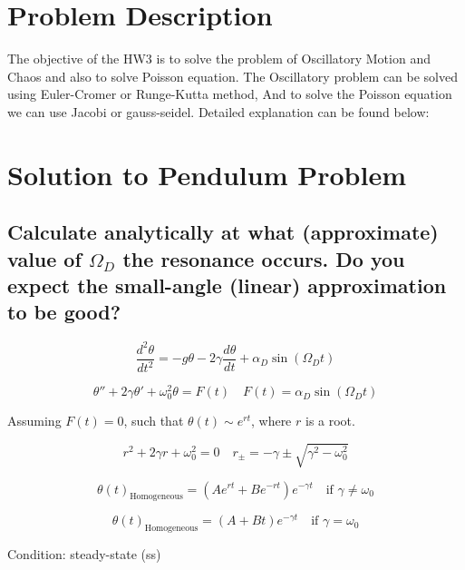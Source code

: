 \documentclass[11pt]{article}
\begin{document}
\section{Problem Description}
The objective of the HW3 is to solve the problem of Oscillatory Motion and Chaos and also to solve Poisson equation. The Oscillatory problem can be solved using Euler-Cromer or Runge-Kutta method, And to solve the Poisson equation we can use Jacobi or gauss-seidel. Detailed explanation can be found below:

\section{Solution to Pendulum Problem}

\subsection{Calculate analytically at what (approximate) value of $\Omega_D$ the resonance occurs. Do you expect the small-angle (linear) approximation to be good?}

\begin{equation}
\frac{d^2\theta}{dt^2} = -g\theta - 2\gamma\frac{d\theta}{dt} + \alpha_D\sin(\Omega_D t) \tag{1}
\end{equation}

\begin{equation}
\theta'' + 2\gamma\theta' + \omega_0^2\theta = F(t) \quad F(t) = \alpha_D \sin(\Omega_D t) \tag{2}
\end{equation}

Assuming $F(t) = 0$, such that $\theta(t) \sim e^{rt}$, where $r$ is a root.

\begin{equation}
r^2 + 2\gamma r + \omega_0^2 = 0 \quad r_\pm = -\gamma \pm \sqrt{\gamma^2 - \omega_0^2} \tag{3}
\end{equation}

\begin{equation}
\theta(t)_{\text{Homogeneous}} = 
(Ae^{rt} + Be^{-rt})e^{-\gamma t} \quad \text{if } \gamma \neq \omega_0 \tag{5.1}
\end{equation}

\begin{equation}
\theta(t)_{\text{Homogeneous}} = (A + Bt)e^{-\gamma t} \quad \text{if } \gamma = \omega_0
\tag{5.2}
\end{equation}

Condition: steady-state (ss)
\end{document}
